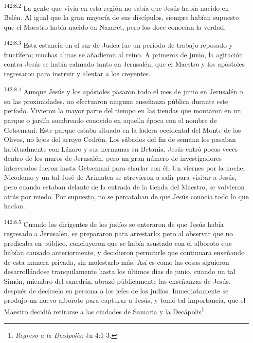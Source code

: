 \par
\textsuperscript{142:8.2} La gente que vivía en esta región no sabía que Jesús había nacido en Belén. Al igual que la gran mayoría de sus discípulos, siempre habían supuesto que el Maestro había nacido en Nazaret, pero los doce conocían la verdad.

\par
\textsuperscript{142:8.3} Esta estancia en el sur de Judea fue un período de trabajo reposado y fructífero; muchas almas se añadieron al reino. A primeros de junio, la agitación contra Jesús se había calmado tanto en Jerusalén, que el Maestro y los apóstoles regresaron para instruir y alentar a los creyentes.

\par
\textsuperscript{142:8.4} Aunque Jesús y los apóstoles pasaron todo el mes de junio en Jerusalén o en las proximidades, no efectuaron ninguna enseñanza pública durante este período. Vivieron la mayor parte del tiempo en las tiendas que montaron en un parque o jardín sombreado conocido en aquella época con el nombre de Getsemaní. Este parque estaba situado en la ladera occidental del Monte de los Olivos, no lejos del arroyo Cedrón. Los sábados del fin de semana los pasaban habitualmente con Lázaro y sus hermanas en Betania. Jesús entró pocas veces dentro de los muros de Jerusalén, pero un gran número de investigadores interesados fueron hasta Getsemaní para charlar con él. Un viernes por la noche, Nicodemo y un tal José de Arimatea se atrevieron a salir para visitar a Jesús, pero cuando estaban delante de la entrada de la tienda del Maestro, se volvieron atrás por miedo. Por supuesto, no se percataban de que Jesús conocía todo lo que hacían.

\par
\textsuperscript{142:8.5} Cuando los dirigentes de los judíos se enteraron de que Jesús había regresado a Jerusalén, se prepararon para arrestarlo; pero al observar que no predicaba en público, concluyeron que se había asustado con el alboroto que habían causado anteriormente, y decidieron permitirle que continuara enseñando de esta manera privada, sin molestarlo más. Así es como las cosas siguieron desarrollándose tranquilamente hasta los últimos días de junio, cuando un tal Simón, miembro del sanedrín, abrazó públicamente las enseñanzas de Jesús, después de decírselo en persona a los jefes de los judíos. Inmediatamente se produjo un nuevo alboroto para capturar a Jesús, y tomó tal importancia, que el Maestro decidió retirarse a las ciudades de Samaria y la Decápolis\footnote{\textit{Regreso a la Decápolis}: Jn 4:1-3.}.